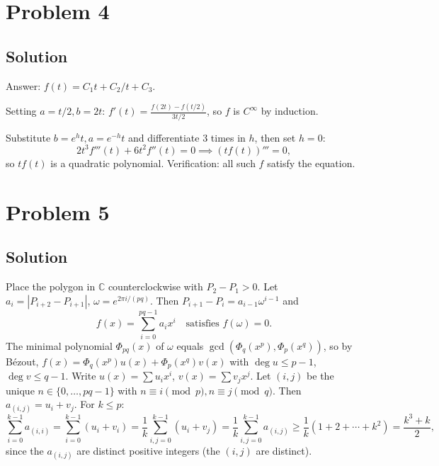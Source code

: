 \documentclass{article}
\begin{document}
\section*{Problem 4}
\subsection*{Solution}
Answer: $f(t) = C_1 t + C_2/t + C_3$.

Setting $a = t/2, b = 2t$: $f'(t) = \frac{f(2t) - f(t/2)}{3t/2}$, so $f$ is $C^\infty$ by induction.

Substitute $b = e^h t, a = e^{-h} t$ and differentiate 3 times in $h$, then set $h = 0$:
\[ 2t^3 f'''(t) + 6t^2 f''(t) = 0 \implies (tf(t))''' = 0, \]
so $t f(t)$ is a quadratic polynomial. Verification: all such $f$ satisfy the equation.

\section*{Problem 5}
\subsection*{Solution}
Place the polygon in $\mathbb{C}$ counterclockwise with $P_2 - P_1 > 0$. Let $a_i = |P_{i+2} - P_{i+1}|$, $\omega = e^{2\pi i/(pq)}$. Then $P_{i+1} - P_i = a_{i-1} \omega^{i-1}$ and
\[ f(x) = \sum_{i=0}^{pq-1} a_i x^i \quad \text{satisfies } f(\omega) = 0. \]
The minimal polynomial $\Phi_{pq}(x)$ of $\omega$ equals $\gcd(\Phi_q(x^p), \Phi_p(x^q))$, so by Bézout, $f(x) = \Phi_q(x^p) u(x) + \Phi_p(x^q) v(x)$ with $\deg u \leq p-1$, $\deg v \leq q-1$. Write $u(x) = \sum u_i x^i$, $v(x) = \sum v_j x^j$. Let $(i,j)$ be the unique $n \in \{0, \ldots, pq-1\}$ with $n \equiv i \pmod p, n \equiv j \pmod q$. Then $a_{(i,j)} = u_i + v_j$. For $k \leq p$:
\[ \sum_{i=0}^{k-1} a_{(i,i)} = \sum_{i=0}^{k-1}(u_i + v_i) = \frac{1}{k} \sum_{i,j=0}^{k-1}(u_i + v_j) = \frac{1}{k}\sum_{i,j=0}^{k-1} a_{(i,j)} \geq \frac{1}{k}(1 + 2 + \cdots + k^2) = \frac{k^3 + k}{2}, \]
since the $a_{(i,j)}$ are distinct positive integers (the $(i,j)$ are distinct).
\end{document}
